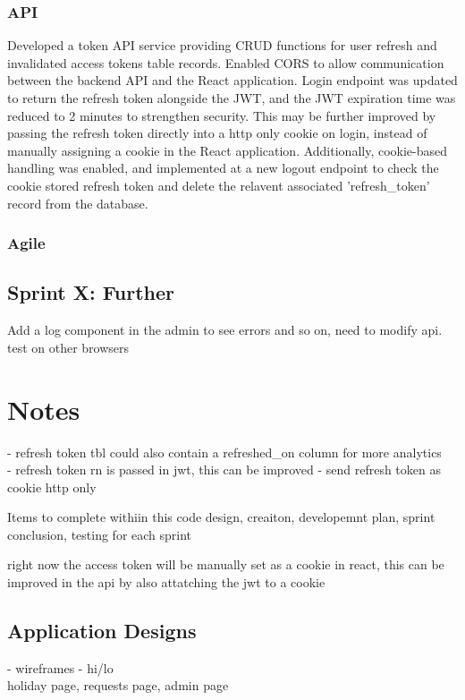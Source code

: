 \documentclass{article}
\begin{document}
\subsubsection{API}
Developed a token API service providing CRUD functions for user refresh and invalidated access tokens table records.
Enabled CORS to allow communication between the backend API and the React application.
Login endpoint was updated to return the refresh token alongside the JWT, and the JWT expiration time was reduced to 2 minutes to strengthen security.
This may be further improved by passing the refresh token directly into a http only cookie on login, instead of manually assigning a cookie in the React application.
Additionally, cookie-based handling was enabled, and implemented at a new logout endpoint to check the cookie stored refresh token and delete the relavent associated 'refresh\_token' record from the database.

\subsubsection{Agile}
\pagebreak{}

\subsection{Sprint X: Further}
Add a log component in the admin to see errors and so on, need to modify api.
test on other browsers
\pagebreak{}


\section{Notes}
- refresh token tbl could also contain a refreshed\_on column for more analytics \\
- refresh token rn is passed in jwt, this can be improved - send refresh token as cookie http only

Items to complete withiin this
code design, creaiton, developemnt plan, sprint conclusion, testing for each sprint

right now the access token will be manually set as a cookie in react, this can be improved in the api by also attatching the jwt to a cookie


\subsection{Application Designs}
- wireframes
- hi/lo \\
holiday page, requests page, admin page
\end{document}
